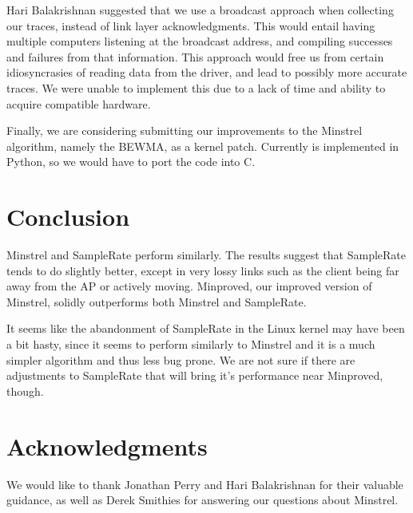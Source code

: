 \documentclass[letterpaper,twocolumn,10pt]{article}
\begin{document}
Hari Balakrishnan suggested that we use a broadcast approach when collecting our traces, instead of link layer acknowledgments. This would entail having multiple computers listening at the broadcast address, and compiling successes and failures from that information. This approach would free us from certain idiosyncrasies of reading data from the driver, and lead to possibly more accurate traces. We were unable to implement this due to a lack of time and ability to acquire compatible hardware.

Finally, we are considering submitting our improvements to the Minstrel algorithm, namely the BEWMA, as a kernel patch. Currently is implemented in Python, so we would have to port the code into C.

\section{Conclusion}

Minstrel and SampleRate perform similarly. The results suggest that SampleRate tends to do slightly better, except in very lossy links such as the client being far away from the AP or actively moving. Minproved, our improved version of Minstrel, solidly outperforms both Minstrel and SampleRate. 

It seems like the abandonment of SampleRate in the Linux kernel may have been a bit hasty, since it seems to perform similarly to Minstrel and it is a much simpler algorithm and thus less bug prone. We are not sure if there are adjustments to SampleRate that will bring it's performance near Minproved, though. 

\section{Acknowledgments}
We would like to thank Jonathan Perry and Hari Balakrishnan for their valuable guidance, as well as Derek Smithies for answering our questions about Minstrel. 


{\footnotesize 
}
\end{document}
